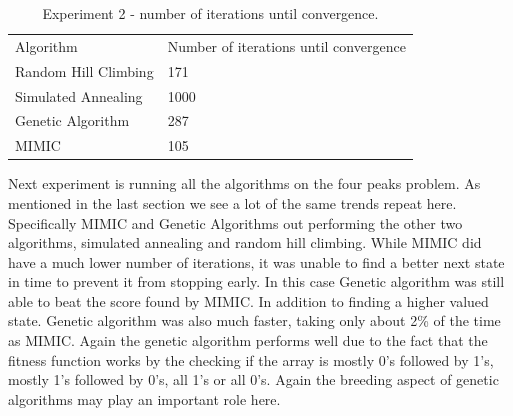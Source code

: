 \documentclass[
letterpaper, %
]{IEEEtran}
\begin{document}
	\begin{center}
		\begin{table}
			\begin{tabular}{ll}
				Algorithm            & Number of iterations until convergence \\
				Random Hill Climbing & 171                                    \\
				Simulated Annealing  & 1000                                    \\
				Genetic Algorithm    & 287                                    \\
				MIMIC                & 105
			\end{tabular}
			\caption{Experiment 2 - number of iterations until convergence.}
			\label{table:exp2data}
		\end{table}
	\end{center}

	Next experiment is running all the algorithms on the four peaks problem. As mentioned in the last section we see a lot of the same trends repeat here. Specifically MIMIC and Genetic Algorithms out performing the other two algorithms, simulated annealing and random hill climbing. While MIMIC did have a much lower number of iterations, it was unable to find a better next state in time to prevent it from stopping early. In this case Genetic algorithm was still able to beat the score found by MIMIC. In addition to finding a higher valued state. Genetic algorithm was also much faster, taking only about 2\% of the time as MIMIC. Again the genetic algorithm performs well due to the fact that the fitness function works by the checking if the array is mostly 0's followed by 1's, mostly 1's followed by 0's, all 1's or all 0's. Again the breeding aspect of genetic algorithms may play an important role here.
	
\end{document}

